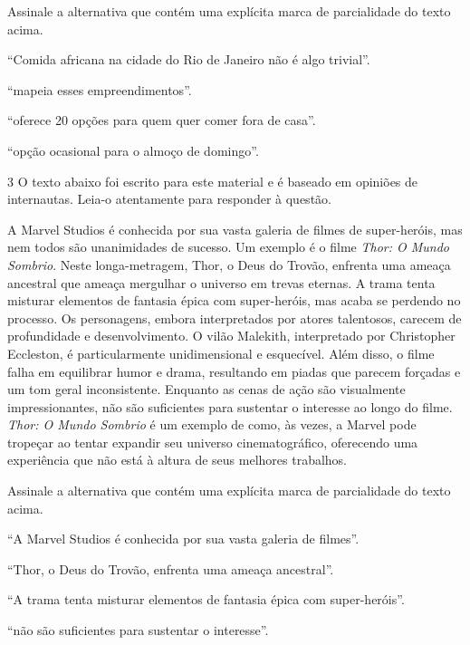 Assinale a alternativa que contém uma explícita marca de parcialidade do texto acima.

\begin{escolha}

  \item ``Comida africana na cidade do Rio de Janeiro não é algo trivial''.
  
  \item ``mapeia esses empreendimentos''.
  
  \item ``oferece 20 opções para quem quer comer fora de casa''.
  
  \item ``opção ocasional para o almoço de domingo''.

\end{escolha}

\num{3} O texto abaixo foi escrito para este material e é baseado em opiniões
de internautas. Leia-o atentamente para responder à questão.

\begin{myquote}

A Marvel Studios é conhecida por sua vasta galeria de filmes de super-heróis,
mas nem todos são unanimidades de sucesso. Um exemplo é o filme \textit{Thor: O Mundo
Sombrio}. Neste longa-metragem, Thor, o Deus do Trovão, enfrenta uma ameaça
ancestral que ameaça mergulhar o universo em trevas eternas. A trama tenta
misturar elementos de fantasia épica com super-heróis, mas acaba se perdendo
no processo. Os personagens, embora interpretados por atores talentosos,
carecem de profundidade e desenvolvimento. O vilão Malekith, interpretado por
Christopher Eccleston, é particularmente unidimensional e esquecível. Além
disso, o filme falha em equilibrar humor e drama, resultando em piadas que
parecem forçadas e um tom geral inconsistente. Enquanto as cenas de ação são
visualmente impressionantes, não são suficientes para sustentar o interesse ao
longo do filme. \textit{Thor: O Mundo Sombrio} é um exemplo de como, às vezes, a
Marvel pode tropeçar ao tentar expandir seu universo cinematográfico,
oferecendo uma experiência que não está à altura de seus melhores trabalhos.


\end{myquote}

Assinale a alternativa que contém uma explícita marca de parcialidade do texto acima.

\begin{escolha}
  
  \item ``A Marvel Studios é conhecida por sua vasta galeria de filmes''.
  
  \item ``Thor, o Deus do Trovão, enfrenta uma ameaça ancestral''.
  
  \item ``A trama tenta misturar elementos de fantasia épica com super-heróis''.
  
  \item ``não são suficientes para sustentar o interesse''.

\end{escolha}

